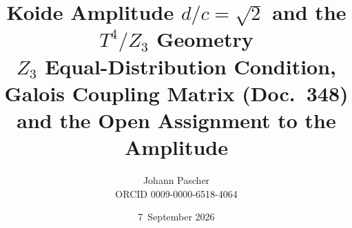 \documentclass[11pt,a4paper]{report}
\title{Koide Amplitude $d/c = \sqrt{2}$ and the $T^4/Z_3$ Geometry\\[0.5em]
  \large $Z_3$ Equal-Distribution Condition, Galois Coupling Matrix (Doc.~348)
  and the Open Assignment to the Amplitude}
\date{7~September 2026}
\author{Johann Pascher\\\small ORCID 0009-0000-6518-4064}
\begin{document}
\renewcommand{\thechapter}{}
\renewcommand{\thesection}{\arabic{section}}
\maketitle
\tableofcontents

\end{document}
